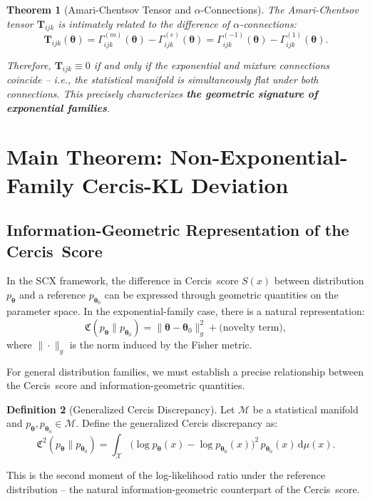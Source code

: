 \documentclass[12pt,a4paper]{article}
\theoremstyle{plain}
\newtheorem{theorem}{Theorem}
\theoremstyle{definition}
\newtheorem{definition}[theorem]{Definition}
\theoremstyle{remark}
\newcommand{\SCX}{\textsf{SCX}}
\newcommand{\Cercis}{\textsf{Cercis}}
\newcommand{\dd}{\mathrm{d}}
\newcommand{\MM}{\mathcal{M}}
\newcommand{\CercisScore}{\mathfrak{C}}
\newcommand{\ACT}{\mathbf{T}}    %
\begin{document}
\begin{theorem}[Amari-Chentsov Tensor and $\alpha$-Connections]
\label{thm:AC_alpha}
The Amari-Chentsov tensor $\ACT_{ijk}$ is intimately related to the difference of $\alpha$-connections:
\begin{equation}\label{eq:AC_vs_alpha}
    \ACT_{ijk}(\bm{\theta}) = \Gamma^{(m)}_{ijk}(\bm{\theta}) - \Gamma^{(e)}_{ijk}(\bm{\theta})
    = \Gamma^{(-1)}_{ijk}(\bm{\theta}) - \Gamma^{(1)}_{ijk}(\bm{\theta}).
\end{equation}

Therefore, $\ACT_{ijk} \equiv 0$ if and only if the exponential and mixture connections coincide -- i.e., the statistical manifold is simultaneously flat under both connections. This precisely characterizes \textbf{the geometric signature of exponential families}.
\end{theorem}

\section{Main Theorem: Non-Exponential-Family Cercis-KL Deviation}
\label{sec:main_theorem}

\subsection{Information-Geometric Representation of the \Cercis\ Score}

In the \SCX{} framework, the difference in \Cercis\ score $S(x)$ between distribution $p_{\bm{\theta}}$ and a reference $p_{\bm{\theta}_0}$ can be expressed through geometric quantities on the parameter space. In the exponential-family case, there is a natural representation:
\begin{equation}\label{eq:cercis_exp_rep}
    \CercisScore(p_{\bm{\theta}} \| p_{\bm{\theta}_0}) = \|\bm{\theta} - \bm{\theta}_0\|_{g}^2 + \text{(novelty term)},
\end{equation}
where $\|\cdot\|_{g}$ is the norm induced by the Fisher metric.

For general distribution families, we must establish a precise relationship between the \Cercis\ score and information-geometric quantities.

\begin{definition}[Generalized Cercis Discrepancy]
\label{def:gen_cercis}
Let $\MM$ be a statistical manifold and $p_{\bm{\theta}}, p_{\bm{\theta}_0} \in \MM$. Define the generalized Cercis discrepancy as:
\begin{equation}\label{eq:gen_cercis_def}
    \CercisScore^2(p_{\bm{\theta}} \| p_{\bm{\theta}_0}) = \int_{\mathcal{X}} \bigl(\log p_{\bm{\theta}}(x) - \log p_{\bm{\theta}_0}(x)\bigr)^2 \, p_{\bm{\theta}_0}(x) \, \dd\mu(x).
\end{equation}

This is the second moment of the log-likelihood ratio under the reference distribution -- the natural information-geometric counterpart of the \Cercis\ score.
\end{definition}
\end{document}
